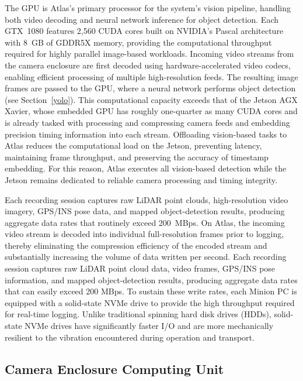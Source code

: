 \documentclass{erauthesis}
\begin{document}
The \ac{GPU} is Atlas's primary processor for the system’s vision pipeline, handling both video decoding and neural network inference for object detection.
Each GTX~1080 features 2,560 CUDA cores built on NVIDIA’s Pascal architecture with 8~GB of GDDR5X memory, providing the computational throughput required for highly parallel image-based workloads.  
Incoming video streams from the camera enclosure are first decoded using hardware-accelerated video codecs, enabling efficient processing of multiple high-resolution feeds.
The resulting image frames are passed to the \ac{GPU}, where a neural network performs object detection (see Section~\ref{yolo}).
This computational capacity exceeds that of the Jetson AGX Xavier, whose embedded GPU has roughly one-quarter as many CUDA cores and is already tasked with processing and compressing camera feeds and embedding precision timing information into each stream. 
Offloading vision-based tasks to Atlas reduces the computational load on the Jetson, preventing latency, maintaining frame throughput, and preserving the accuracy of timestamp embedding. 
For this reason, Atlas executes all vision-based detection while the Jetson remains dedicated to reliable camera processing and timing integrity.

Each recording session captures raw \ac{LiDAR} point clouds, high-resolution video imagery, GPS/INS pose data, and mapped object-detection results, producing aggregate data rates that routinely exceed 200~\ac{MBps}. On Atlas, the incoming video stream is decoded into individual full-resolution frames prior to logging, thereby eliminating the compression efficiency of the encoded stream and substantially increasing the volume of data written per second.
Each recording session captures raw \ac{LiDAR} point cloud data, video frames, GPS/INS pose information, and mapped object-detection results, producing aggregate data rates that can easily exceed 200 \ac{MBps}.
To sustain these write rates, each Minion PC is equipped with a solid-state \ac{NVMe} drive to provide the high throughput required for real-time logging. 
Unlike traditional spinning hard disk drives (HDDs), solid-state \ac{NVMe} drives have significantly faster I/O and are more mechanically resilient to the vibration encountered during operation and transport.



\subsection{Camera Enclosure Computing Unit} \label{comp:camera_enclosure}
\end{document}
